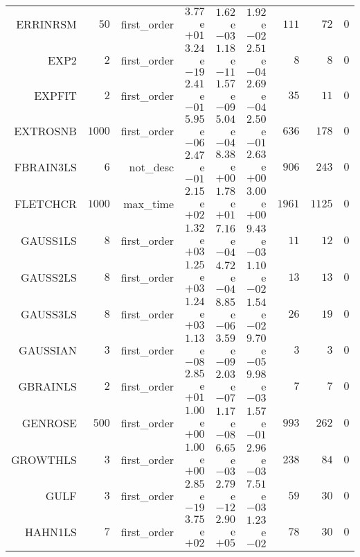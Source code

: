 \begin{longtable}{rrrrrrrrr}
ERRINRSM & \(    50\) & first\_order & \( 3.77\)e\(+01\) & \( 1.62\)e\(-03\) & \( 1.92\)e\(-02\) & \(   111\) & \(    72\) & \(     0\) \\
EXP2 & \(     2\) & first\_order & \( 3.24\)e\(-19\) & \( 1.18\)e\(-11\) & \( 2.51\)e\(-04\) & \(     8\) & \(     8\) & \(     0\) \\
EXPFIT & \(     2\) & first\_order & \( 2.41\)e\(-01\) & \( 1.57\)e\(-09\) & \( 2.69\)e\(-04\) & \(    35\) & \(    11\) & \(     0\) \\
EXTROSNB & \(  1000\) & first\_order & \( 5.95\)e\(-06\) & \( 5.04\)e\(-04\) & \( 2.50\)e\(-01\) & \(   636\) & \(   178\) & \(     0\) \\
FBRAIN3LS & \(     6\) & not\_desc & \( 2.47\)e\(-01\) & \( 8.38\)e\(+00\) & \( 2.63\)e\(+00\) & \(   906\) & \(   243\) & \(     0\) \\
FLETCHCR & \(  1000\) & max\_time & \( 2.15\)e\(+02\) & \( 1.78\)e\(+01\) & \( 3.00\)e\(+00\) & \(  1961\) & \(  1125\) & \(     0\) \\
GAUSS1LS & \(     8\) & first\_order & \( 1.32\)e\(+03\) & \( 7.16\)e\(-04\) & \( 9.43\)e\(-03\) & \(    11\) & \(    12\) & \(     0\) \\
GAUSS2LS & \(     8\) & first\_order & \( 1.25\)e\(+03\) & \( 4.72\)e\(-04\) & \( 1.10\)e\(-02\) & \(    13\) & \(    13\) & \(     0\) \\
GAUSS3LS & \(     8\) & first\_order & \( 1.24\)e\(+03\) & \( 8.85\)e\(-06\) & \( 1.54\)e\(-02\) & \(    26\) & \(    19\) & \(     0\) \\
GAUSSIAN & \(     3\) & first\_order & \( 1.13\)e\(-08\) & \( 3.59\)e\(-09\) & \( 9.70\)e\(-05\) & \(     3\) & \(     3\) & \(     0\) \\
GBRAINLS & \(     2\) & first\_order & \( 2.85\)e\(+01\) & \( 2.03\)e\(-07\) & \( 9.98\)e\(-03\) & \(     7\) & \(     7\) & \(     0\) \\
GENROSE & \(   500\) & first\_order & \( 1.00\)e\(+00\) & \( 1.17\)e\(-08\) & \( 1.57\)e\(-01\) & \(   993\) & \(   262\) & \(     0\) \\
GROWTHLS & \(     3\) & first\_order & \( 1.00\)e\(+00\) & \( 6.65\)e\(-03\) & \( 2.96\)e\(-03\) & \(   238\) & \(    84\) & \(     0\) \\
GULF & \(     3\) & first\_order & \( 2.85\)e\(-19\) & \( 2.79\)e\(-12\) & \( 7.51\)e\(-03\) & \(    59\) & \(    30\) & \(     0\) \\
HAHN1LS & \(     7\) & first\_order & \( 3.75\)e\(+02\) & \( 2.90\)e\(+05\) & \( 1.23\)e\(-02\) & \(    78\) & \(    30\) & \(     0\) \\

\end{longtable}
